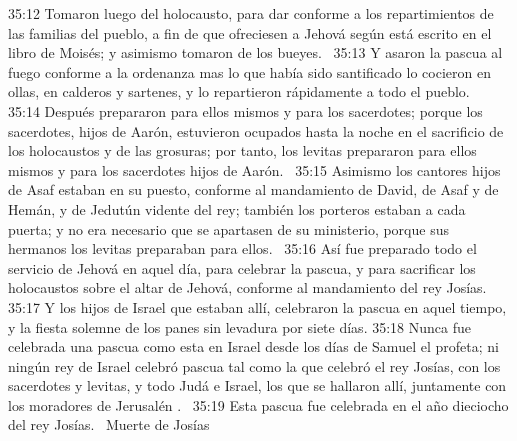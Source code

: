 																																			35:12 Tomaron luego del holocausto, para dar conforme a los repartimientos de las familias del pueblo, a fin de que ofreciesen a Jehová según está escrito en el libro de Moisés; y asimismo tomaron de los bueyes.  
																																			35:13 Y asaron la pascua al fuego conforme a la ordenanza  mas lo que había sido santificado lo cocieron en ollas, en calderos y sartenes, y lo repartieron rápidamente a todo el pueblo.  
																																			35:14 Después prepararon para ellos mismos y para los sacerdotes; porque los sacerdotes, hijos de Aarón, estuvieron ocupados hasta la noche en el sacrificio de los holocaustos y de las grosuras; por tanto, los levitas prepararon para ellos mismos y para los sacerdotes hijos de Aarón.  
																																			35:15 Asimismo los cantores hijos de Asaf estaban en su puesto, conforme al mandamiento de David, de Asaf y de Hemán, y de Jedutún vidente del rey; también los porteros estaban a cada puerta; y no era necesario que se apartasen de su ministerio, porque sus hermanos los levitas preparaban para ellos.  
																																			35:16 Así fue preparado todo el servicio de Jehová en aquel día, para celebrar la pascua, y para sacrificar los holocaustos sobre el altar de Jehová, conforme al mandamiento del rey Josías.  
																																			35:17 Y los hijos de Israel que estaban allí, celebraron la pascua en aquel tiempo, y la fiesta solemne de los panes sin levadura por siete días. 
																																			35:18 Nunca fue celebrada una pascua como esta en Israel desde los días de Samuel el profeta; ni ningún rey de Israel celebró pascua tal como la que celebró el rey Josías, con los sacerdotes y levitas, y todo Judá e Israel, los que se hallaron allí, juntamente con los moradores de Jerusalén .  
																																			35:19 Esta pascua fue celebrada en el año dieciocho del rey Josías.  
																																			Muerte de Josías  
																																			

